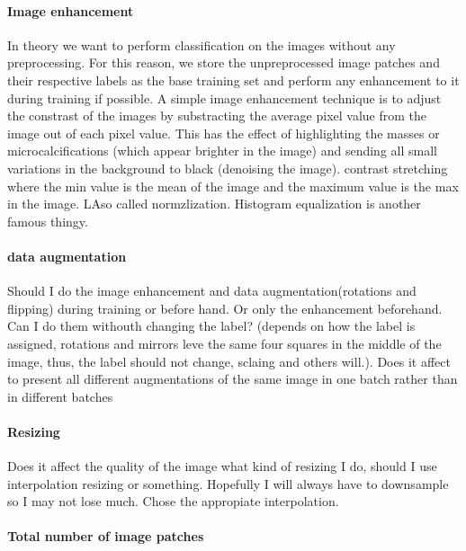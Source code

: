 \paragraph{Image enhancement}
In theory we want to perform classification on the images without any preprocessing. For this reason, we store the unpreprocessed image patches and their respective labels as the base training set and perform any enhancement to it during training if possible. A simple image enhancement technique is to adjust the constrast of the images by substracting the average pixel value from the image out of each pixel value. This has the effect of highlighting the masses or microcalcifications (which appear brighter in the image) and sending all small variations in the background to black (denoising the image).
contrast stretching where the min value is the mean of the image and the maximum value is the max in the image. LAso called normzlization. Histogram equalization is another famous thingy.

\paragraph{data augmentation}
Should I do the image enhancement and data augmentation(rotations and flipping) during training or before hand. Or only the enhancement beforehand. Can I do them withouth changing the label? (depends on how the label is assigned, rotations and mirrors leve the same four squares in the middle of the image, thus, the label should not change, sclaing and others will.). Does it affect to present all different augmentations of the same image in one batch rather than in different batches

\paragraph{Resizing}
Does it affect the quality of the image what kind of resizing I do, should I use interpolation resizing or something. Hopefully I will always have to downsample so I may not lose much.
Chose the appropiate interpolation. %

\paragraph{Total number of image patches}


